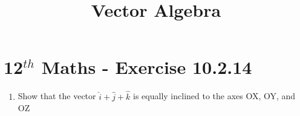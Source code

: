 \documentclass[12pt]{article}
\begin{document}
\begin{center}
\title{\textbf{Vector Algebra}}
\date{\vspace{-5ex}} %
\maketitle
\end{center}
\setcounter{page}{1}
\section{12$^{th}$ Maths - Exercise 10.2.14}

\begin{enumerate}
\item Show that the vector $\hat{i}+\hat{j}+\hat{k}$ is equally inclined to the axes OX, OY, and OZ

\end{enumerate}
\end{document}
